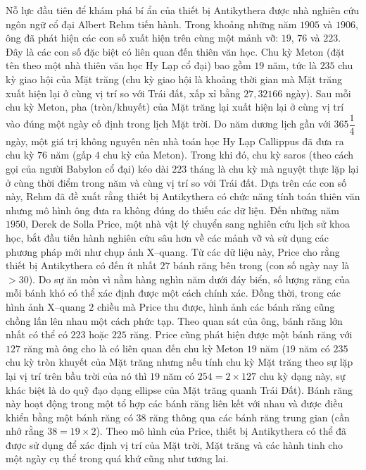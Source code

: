 \begin{multicols}{2}
	Nỗ lực đầu tiên để khám phá bí ẩn của thiết bị Antikythera được nhà nghiên cứu ngôn ngữ cổ đại Albert Rehm tiến hành. Trong khoảng những năm $1905$ và $1906$, ông đã phát hiện các con số xuất hiện trên cùng một mảnh vỡ: $19$, $76$ và $223$. Đây là các con số đặc biệt có liên quan đến thiên văn học. Chu kỳ Meton (đặt tên theo một nhà thiên văn học Hy Lạp cổ đại) bao gồm $19$ năm, tức là $235$ chu kỳ giao hội của Mặt trăng (chu kỳ giao hội là khoảng thời gian mà Mặt trăng xuất hiện lại ở cùng vị trí so với Trái đất, xấp xỉ bằng $27{,}32166$ ngày). Sau mỗi chu kỳ Meton, pha (tròn/khuyết) của Mặt trăng lại xuất hiện lại ở cùng vị trí vào đúng một ngày cố định trong lịch Mặt trời. Do năm dương lịch gần với $365\dfrac{1}{4}$ ngày, một giá trị không nguyên nên nhà toán học Hy Lạp Callippus đã đưa ra chu kỳ $76$ năm (gấp $4$ chu kỳ của Meton). Trong khi đó, chu kỳ saros (theo cách gọi của người Babylon cổ đại) kéo dài $223$ tháng là chu kỳ mà nguyệt thực lặp lại ở cùng thời điểm trong năm và cùng vị trí so với Trái đất. Dựa trên các con số này, Rehm đã đề xuất rằng thiết bị Antikythera có chức năng tính toán thiên văn nhưng mô hình ông đưa ra không đúng do thiếu các dữ liệu.
	\vskip 0.1cm
	Đến những năm $1950$, Derek de Solla Price, một nhà vật lý chuyển sang nghiên cứu lịch sử khoa học, bắt đầu tiến hành nghiên cứu sâu hơn về các mảnh vỡ và sử dụng các phương pháp mới như chụp ảnh X--quang. Từ các dữ liệu này, Price cho rằng thiết bị Antikythera có đến ít nhất $27$ bánh răng bên trong (con số ngày nay là $> 30$). Do sự ăn mòn vì nằm hàng nghìn năm dưới đáy biển, số lượng răng của mỗi bánh khó có thể xác định được một cách chính xác. Đồng thời, trong các hình ảnh X--quang $2$ chiều mà Price thu được, hình ảnh các bánh răng cũng chồng lấn lên nhau một cách phức tạp. Theo quan sát của ông, bánh răng lớn nhất có thể có $223$ hoặc $225$ răng. Price cũng phát hiện được một bánh răng với $127$ răng mà ông cho là có liên quan đến chu kỳ Meton $19$ năm ($19$ năm có $235$ chu kỳ tròn khuyết của Mặt trăng nhưng nếu tính chu kỳ Mặt trăng theo sự lặp lại vị trí trên bầu trời của nó thì $19$ năm có $254=2\times127$ chu kỳ dạng này, sự khác biệt là do quỹ đạo dạng ellipse của Mặt trăng quanh Trái Đất). Bánh răng này hoạt động trong một tổ hợp các bánh răng liên kết với nhau và được điều khiển bằng một bánh răng có $38$ răng thông qua các bánh răng trung gian (cần nhớ rằng $38=19\times2$). Theo mô hình của Price, thiết bị Antikythera có thể đã được sử dụng để xác định vị trí của Mặt trời, Mặt trăng và các hành tinh cho một ngày cụ thể trong quá khứ cũng như tương lai.
	\begin{figure}[H]

\end{figure}
\end{multicols}
